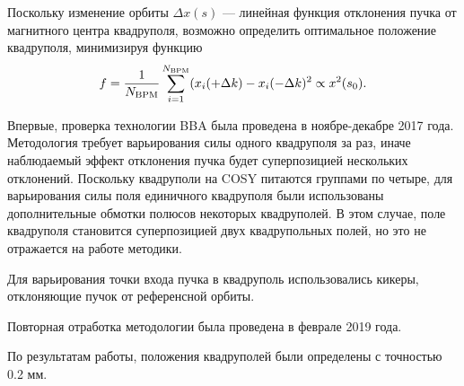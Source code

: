 Поскольку изменение орбиты $\Delta x(s)$ --- линейная функция отклонения пучка от магнитного центра квадруполя, возможно определить оптимальное положение квадруполя, минимизируя функцию
\[
f = \frac{1}{N_{\mathrm{BPM}}}\sum_{i=1}^{N_{\mathrm{BPM}}} (x_i(+\Delta k) -x_i(-\Delta k)^2 \propto x^2(s_0).
\]

Впервые, проверка технологии BBA была проведена в ноябре-декабре 2017 года. Методология требует варьирования силы одного квадруполя за раз, иначе наблюдаемый эффект отклонения пучка будет суперпозицией нескольких отклонений. Поскольку квадруполи на COSY питаются группами по четыре, для варьирования силы поля единичного квадруполя были использованы дополнительные обмотки полюсов некоторых квадруполей. В этом случае, поле квадруполя становится суперпозицией двух квадрупольных полей, но это не отражается на работе методики. 

Для варьирования точки входа пучка в квадруполь использовались кикеры, отклоняющие пучок от референсной орбиты.

Повторная отработка методологии была проведена в феврале 2019 года.

По результатам работы, положения квадруполей были определены с точностью 0.2 мм.~\cite[стр.~182]{YellowReport}